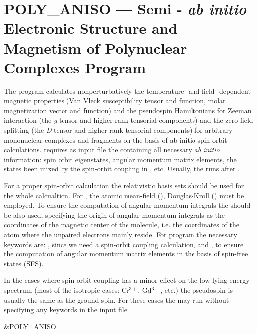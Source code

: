 \section{POLY\_ANISO --- Semi - {\it ab initio} Electronic Structure and Magnetism of Polynuclear Complexes Program}
\label{TUT:sec:single_aniso}

The program  calculates nonperturbatively the temperature- and field- dependent magnetic
properties (Van Vleck susceptibility tensor and function, molar magnetization vector and function) and the
pseudospin Hamiltonians for Zeeman interaction (the {\it g} tensor and higher rank tensorial components) and the
zero-field splitting (the \textit{D} tensor and higher rank tensorial components) for arbitrary mononuclear complexes
and fragments on the basis of ab initio spin-orbit calculations.
 requires as input file the  containing all necessary
{\it ab initio} information: spin orbit eigenstates, angular momentum matrix elements, the states been mixed
by the spin-orbit coupling in , etc.  Usually, the 
runs after .

For a proper spin-orbit calculation the relativistic basis sets should be used for the whole calcualtion.
For , the atomic mean-field (), Douglas-Kroll () must be employed.
To ensure the computation of angular momentum integrals the  should be also used, specifying the origin
of angular momentum integrals as the coordinates of the magnetic center of the molecule, i.e. the coordinates of the atom
where the unpaired electrons mainly reside.  For program  the necessary keywords are: ,
since we need a spin-orbit coupling calculation, and , to ensure the computation of angular momentum
matrix elements in the basis of spin-free states (SFS).

In the cases where spin-orbit coupling has a minor effect on the low-lying energy spectrum (most of the
isotropic cases: Cr$^{3+}$, Gd$^{3+}$, etc.) the pseudospin is usually the same as the ground spin. For these cases
the  may run without specifying any keywords in the input file.

\begin{inputlisting}
 &POLY_ANISO
\end{inputlisting}


